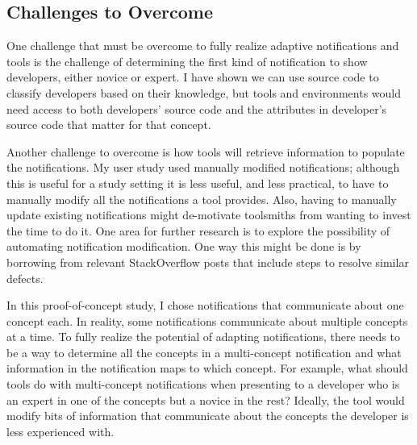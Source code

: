  

\subsection{Challenges to Overcome}

One challenge that must be overcome to fully realize adaptive notifications and tools is the challenge of determining the first kind of notification to show developers, either novice or expert. I have shown we can use source code to classify developers based on their knowledge, but tools and environments would need access to both developers' source code and the attributes in developer's source code that matter for that concept. 

Another challenge to overcome is how tools will retrieve information to populate the notifications. My user study used manually modified notifications; although this is useful for a study setting it is less useful, and less practical, to have to manually modify all the notifications a tool provides. Also, having to manually update existing  notifications might de-motivate toolsmiths from wanting to invest the time to do it. One area for further research is to explore the possibility of automating notification modification. One way this might be done is by borrowing from relevant StackOverflow posts that include steps to resolve similar defects.

In this proof-of-concept study, I chose notifications that communicate about one concept each. In reality, some notifications communicate about multiple concepts at a time.
To fully realize the potential of adapting notifications, there needs to be a way to determine all the concepts in a multi-concept notification and what information in the notification maps to which concept.
For example, what should tools do with multi-concept notifications when presenting to a developer who is an expert in one of the concepts but a novice in the rest?
Ideally, the tool would modify bits of information that communicate about the concepts the developer is less experienced with.

